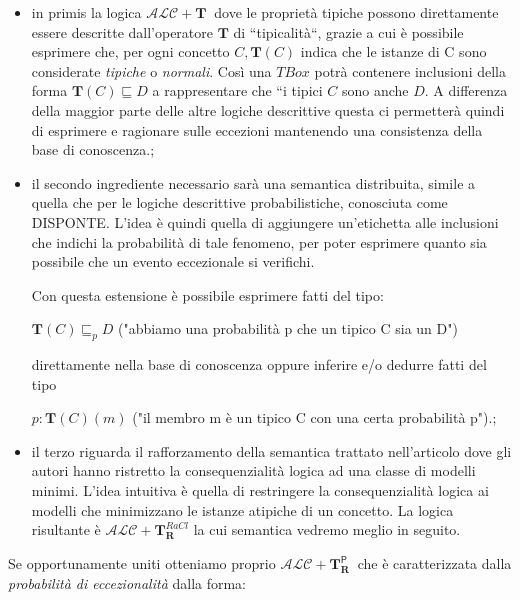\begin{itemize} \label{itemize: 3 comp}
	\item in primis la logica $\mathcal {ALC}+\mathbf{T}\ $ dove le proprietà tipiche possono 
	direttamente essere descritte dall'operatore $\mathbf{T}$ di “tipicalità“, grazie a cui
 è possibile esprimere che, per ogni concetto $\mathit{C},\mathbf{T}(\mathit{C})$ 
 indica che le istanze di C sono considerate \textit{tipiche} o \textit{normali}.
	Così una $\mathit{TBox}$ potrà contenere inclusioni della forma $\mathbf{T}(\mathit{C})\sqsubseteq \mathit{D}$ 
	a rappresentare che “i tipici $\mathit{C}$ sono anche $\mathit{D}$. A differenza della 
	maggior parte delle altre logiche descrittive questa ci permetterà quindi
	di esprimere e ragionare sulle eccezioni mantenendo una consistenza della base di conoscenza.\cite{DLExtension};
		
	\item il secondo ingrediente necessario sarà una semantica distribuita, simile 
	a quella che per le logiche descrittive probabilistiche, conosciuta come DISPONTE. 
	L’idea è quindi quella di aggiungere un’etichetta alle inclusioni che indichi la probabilità 
	di tale fenomeno, per poter esprimere quanto sia possibile che un evento eccezionale si verifichi.\par
	Con questa estensione è possibile esprimere fatti del tipo: \par 
	$ \mathbf{T}(\mathit{C})\sqsubseteq_{p} \mathit{D} $ ("abbiamo una probabilità p che un tipico C sia un D") \par 
	direttamente nella base di conoscenza oppure inferire e/o dedurre fatti del tipo 
	\par$ \mathit{p}:\mathbf{T}(\mathit{C})(\mathit{m})$ ("il membro m è un tipico C con una certa probabilità p").\cite{ProbOfEx};
		
	\item il terzo riguarda il rafforzamento della semantica trattato nell'articolo \cite{FromPLtoDL} 
	dove gli autori hanno ristretto la consequenzialità logica ad una classe di
	modelli minimi. L’idea intuitiva è quella di restringere la consequenzialità logica ai
	modelli che minimizzano le istanze atipiche di un concetto. 
	La logica risultante è $ \mathcal {ALC}+\mathbf{T}_\mathbf{R}^{ \mathit{RaCl}}$ la cui semantica vedremo meglio in seguito.
\end{itemize}
Se opportunamente uniti otteniamo proprio $\mathcal {ALC}+\mathbf{T}_\mathbf{R}^{ \textsf {P} }\ $ 
che è caratterizzata dalla \textit{probabilità di eccezionalità} dalla forma:
